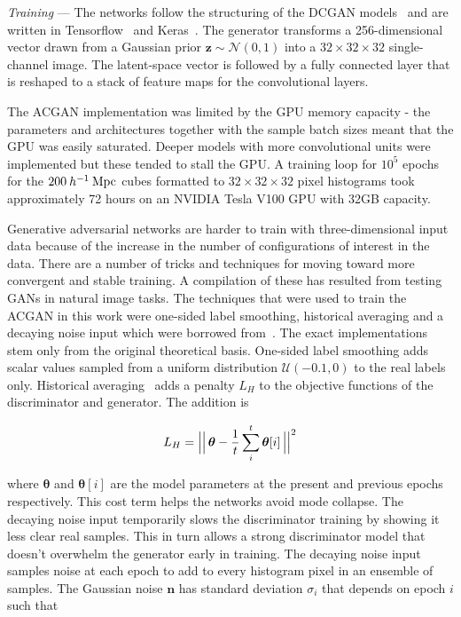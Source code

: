 \documentclass[twocolumn]{article}
\numberwithin{equation}{section}
\begin{document}
{\setlength{\parindent}{0cm}
\textit{Training} --- 
The networks follow the structuring of the DCGAN models~\cite{dcgan} and are written in Tensorflow~\cite{tensorflow} and 
Keras~\cite{keras}. The generator transforms a 256-dimensional vector drawn from a Gaussian prior $\mathbf{z}\sim 
\mathcal{N}(0,1)$ into a $32 \times 32 \times 32$ single-channel image. The latent-space vector is followed by a fully 
connected layer that is reshaped to a stack of feature maps for the convolutional layers. 
}

The ACGAN implementation was limited by the GPU memory capacity - the parameters and architectures together with the 
sample batch sizes meant that the GPU was easily saturated. Deeper models with more convolutional units were implemented 
but these tended to stall the GPU. A training loop for $10^5$ epochs for the $200 \: h^{-1}\: \textup{Mpc}$ cubes 
formatted to $32 \times 32 \times 32$ pixel histograms took approximately 72 hours on an NVIDIA Tesla V100 GPU with 
32GB capacity. 

Generative adversarial networks are harder to train with three-dimensional input data because of the increase in the 
number of configurations of interest in the data. There are a number of tricks and techniques for moving toward more 
convergent and stable training. A compilation of these has resulted from testing GANs in natural image tasks. The techniques
that were used to train the ACGAN in this work were one-sided label smoothing, historical averaging and a decaying noise 
input which were borrowed from~\cite{gantricks_sali, gan_noise_decay}. The exact implementations stem only from the 
original theoretical basis. One-sided label smoothing adds scalar values sampled from a uniform distribution $\mathcal{U}
(-0.1,0)$ to the real labels only. Historical averaging~\cite{gantricks_sali} adds a penalty $L_H$ to the objective functions 
of the discriminator and generator. The addition is

\begin{equation}
    L_H = \Bigl\lvert\Bigl\lvert \, \bm{\theta} - \frac{1}{t} \sum_i^t\bm{\theta}[i] \,  \Bigr\rvert\Bigr\rvert^2
\end{equation}

where $\bm{\theta}$ and $\bm{\theta}[i]$ are the model parameters at the present and previous epochs respectively. This
cost term helps the networks avoid mode collapse. The decaying noise input temporarily slows the discriminator training
by showing it less clear real samples. This in turn allows a strong discriminator model that doesn't overwhelm the generator
early in training. The decaying noise input samples noise at each epoch to add to every histogram pixel in an ensemble of
samples. The Gaussian noise $\mathbf{n}$ has standard deviation $\sigma_i$ that depends on epoch $i$ such that 
\end{document}

